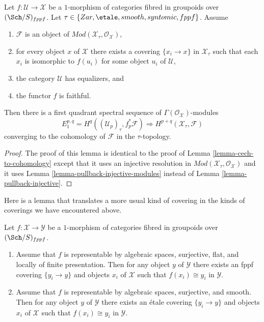 \begin{lemma}
\label{lemma-cech-to-cohomology-modules}
Let $f : \mathcal{U} \to \mathcal{X}$ be a $1$-morphism of categories fibred
in groupoids over $(\Sch/S)_{fppf}$. Let
$\tau \in \{Zar, \etale, smooth, syntomic, fppf\}$.
Assume
\begin{enumerate}
\item $\mathcal{F}$ is an object of
$\textit{Mod}(\mathcal{X}_\tau, \mathcal{O}_\mathcal{X})$,
\item for every object $x$ of $\mathcal{X}$ there exists a covering
$\{x_i \to x\}$ in $\mathcal{X}_\tau$ such that each $x_i$ is isomorphic
to $f(u_i)$ for some object $u_i$ of $\mathcal{U}$,
\item the category $\mathcal{U}$ has equalizers, and
\item the functor $f$ is faithful.
\end{enumerate}
Then there is a first quadrant spectral sequence of
$\Gamma(\mathcal{O}_\mathcal{X})$-modules
$$
E_1^{p, q} = H^q((\mathcal{U}_p)_\tau, f_p^*\mathcal{F})
\Rightarrow
H^{p + q}(\mathcal{X}_\tau, \mathcal{F})
$$
converging to the cohomology of $\mathcal{F}$ in the $\tau$-topology.
\end{lemma}

\begin{proof}
The proof of this lemma is identical to the proof of
Lemma \ref{lemma-cech-to-cohomology}
except that it uses an injective resolution in
$\textit{Mod}(\mathcal{X}_\tau, \mathcal{O}_\mathcal{X})$
and it uses
Lemma \ref{lemma-pullback-injective-modules}
instead of
Lemma \ref{lemma-pullback-injective}.
\end{proof}

\noindent
Here is a lemma that translates a more usual kind of covering in the
kinds of coverings we have encountered above.

\begin{lemma}
\label{lemma-surjective-flat-locally-finite-presentation}
Let $f : \mathcal{X} \to \mathcal{Y}$ be a $1$-morphism of
categories fibred in groupoids over $(\Sch/S)_{fppf}$.
\begin{enumerate}
\item Assume that $f$ is representable by algebraic spaces, surjective,
flat, and locally of finite presentation. Then for any object $y$ of
$\mathcal{Y}$ there exists an fppf covering $\{y_i \to y\}$ and objects
$x_i$ of $\mathcal{X}$ such that $f(x_i) \cong y_i$ in $\mathcal{Y}$.
\item Assume that $f$ is representable by algebraic spaces, surjective,
and smooth. Then for any object $y$ of
$\mathcal{Y}$ there exists an \'etale covering $\{y_i \to y\}$ and objects
$x_i$ of $\mathcal{X}$ such that $f(x_i) \cong y_i$ in $\mathcal{Y}$.
\end{enumerate}
\end{lemma}

